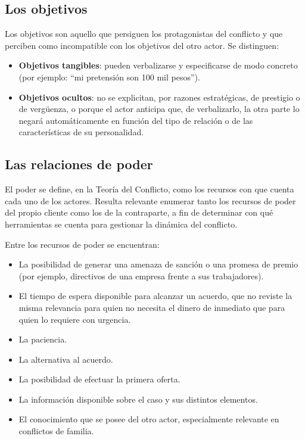 \documentclass[12pt,oneside]{book}
\begin{document}
\subsection{Los objetivos}

Los objetivos son aquello que persiguen los protagonistas del conflicto y que perciben como incompatible con los objetivos del otro actor. Se distinguen:
\begin{itemize}
    \item \textbf{Objetivos tangibles}: pueden verbalizarse y especificarse de modo concreto (por ejemplo: ``mi pretensión son 100 mil pesos'').
    \item \textbf{Objetivos ocultos}: no se explicitan, por razones estratégicas, de prestigio o de vergüenza, o porque el actor anticipa que, de verbalizarlo, la otra parte lo negará automáticamente en función del tipo de relación o de las características de su personalidad.
\end{itemize}

\subsection{Las relaciones de poder}

El poder se define, en la Teoría del Conflicto, como los recursos con que cuenta cada uno de los actores. Resulta relevante enumerar tanto los recursos de poder del propio cliente como los de la contraparte, a fin de determinar con qué herramientas se cuenta para gestionar la dinámica del conflicto.

Entre los recursos de poder se encuentran:
\begin{itemize}
    \item La posibilidad de generar una amenaza de sanción o una promesa de premio (por ejemplo, directivos de una empresa frente a sus trabajadores).
    \item El tiempo de espera disponible para alcanzar un acuerdo, que no reviste la misma relevancia para quien no necesita el dinero de inmediato que para quien lo requiere con urgencia.
    \item La paciencia.
    \item La alternativa al acuerdo.
    \item La posibilidad de efectuar la primera oferta.
    \item La información disponible sobre el caso y sus distintos elementos.
    \item El conocimiento que se posee del otro actor, especialmente relevante en conflictos de familia.
\end{itemize}
\end{document}
